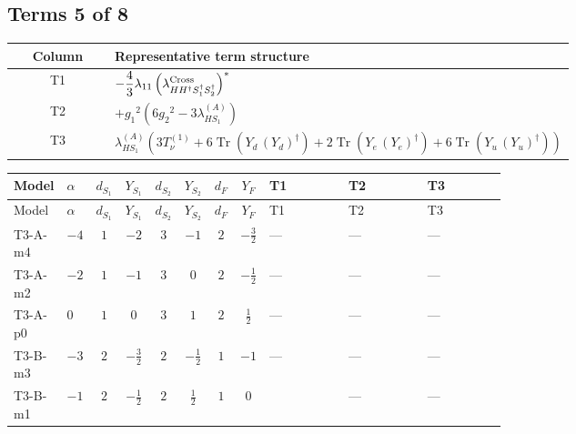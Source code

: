 \documentclass[8pt]{article}
\begin{document}
\begin{landscape}
\subsection*{Terms 5 of 8}
\begin{center}
\begin{tabular}{@{}c >{\raggedright\arraybackslash}p{0.82\linewidth}@{}}
\toprule
Column & Representative term structure \\
\midrule
T1 & \(\displaystyle -\frac{4}{3} {\lambda_{11}} \left({\lambda_{H H^\dagger S_1^\dagger S_2^\dagger}^{\rm Cross}}\right)^{*}\) \\
\midrule
T2 & \(\displaystyle +{g_1}^2 \left(6 {g_2}^2-3 {\lambda_{HS_1}^{(A)}}\right)\) \\
\midrule
T3 & \(\displaystyle {\lambda_{HS_1}^{(A)}} (3 T_{\nu}^{(1)}+6 \operatorname{Tr}\!\left({Y_d}\,\left({Y_d}\right)^{\dagger}\right)+2 \operatorname{Tr}\!\left({Y_e}\,\left({Y_e}\right)^{\dagger}\right)+6 \operatorname{Tr}\!\left({Y_u}\,\left({Y_u}\right)^{\dagger}\right))\) \\
\midrule
\bottomrule
\end{tabular}
\end{center}
\smallskip
\tiny
\begin{longtable}{@{}llcccccc >{\raggedright\arraybackslash}p{0.21\linewidth} >{\raggedright\arraybackslash}p{0.21\linewidth} >{\raggedright\arraybackslash}p{0.21\linewidth}@{}}
\toprule
Model & $\alpha$ & $d_{S_1}$ & $Y_{S_1}$ & $d_{S_2}$ & $Y_{S_2}$ & $d_F$ & $Y_F$ & T1 & T2 & T3 \\
\midrule
\endfirsthead
\toprule
Model & $\alpha$ & $d_{S_1}$ & $Y_{S_1}$ & $d_{S_2}$ & $Y_{S_2}$ & $d_F$ & $Y_F$ & T1 & T2 & T3 \\
\midrule
\endhead
T3-A-m4 & $-4$ & $1$ & $-2$ & $3$ & $-1$ & $2$ & $-\frac{3}{2}$ & --- & --- & --- \\
\midrule
T3-A-m2 & $-2$ & $1$ & $-1$ & $3$ & $0$ & $2$ & $-\frac{1}{2}$ & --- & --- & --- \\
\midrule
T3-A-p0 & $0$ & $1$ & $0$ & $3$ & $1$ & $2$ & $\frac{1}{2}$ & --- & --- & --- \\
\midrule
T3-B-m3 & $-3$ & $2$ & $-\frac{3}{2}$ & $2$ & $-\frac{1}{2}$ & $1$ & $-1$ & --- & --- & --- \\
\midrule
T3-B-m1 & $-1$ & $2$ & $-\frac{1}{2}$ & $2$ & $\frac{1}{2}$ & $1$ & $0$ & \scriptsize\adjustbox{max width=\linewidth}{$\begin{gathered} -\frac{4}{3} {\lambda_{11}} \left({\lambda_{H H^\dagger S_1^\dagger S_2^\dagger}^{\rm Cross}}\right)^{*}\end{gathered}$} & --- & --- \\

\end{longtable}
\end{landscape}
\end{document}
